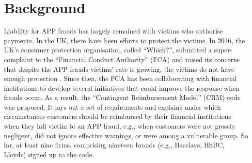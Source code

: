 
\section{Background}\label{sec::background}




Liability for  APP frauds has largely remained with victims who authorise payments. In the UK,  there have been efforts to protect the victims. In  2016, the UK's consumer protection organisation, called ``Which?'', submitted a super-complaint to the
 ``Financial Conduct Authority” (FCA) and raised its concerns that despite the APP frauds victims' rate is growing, the victims do not have enough protection \cite{Which?-super-complaint}.  Since then, the FCA has been collaborating with financial institutions to develop several initiatives that could improve the response when frauds occur. As a result,  the ``Contingent Reimbursement Model'' (CRM)  code  \cite{CRM-code} was proposed. It lays out a set of requirements and explains under which circumstances customers should be reimbursed by their financial institutions when they fall victim to an APP fraud, e.g., when customers were not grossly negligent, did not ignore effective warnings, or were among a vulnerable group. So far,  at least nine firms, comprising nineteen brands (e.g., Barclays, HSBC,  Lloyds) signed up to the code. 



